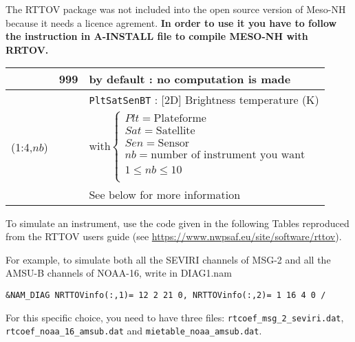 The RTTOV package was not included into the open source version of Meso-NH because it needs a licence agrement.
{\bf In order to use it you have to follow the instruction in A-INSTALL file to compile MESO-NH with RRTOV.}   

\begin{center}
\begin{tabular}{|>{\centering}p{3.1cm}|>{\centering}p{2.4cm}|p{11cm}|}
\hline
\multirow{5}{*}{NRTTOVinfo}\index{NRTTOVinfo!\innam{NAM\_DIAG}}&\textbf{999} & by default : no computation is made\\\cline{2-3}
& \multirow{4}{*}{$Plt$ $Sat$ $Sen$ 0 } &{\tt PltSatSenBT} : [2D] Brightness temperature (K)\\
(1:4,$nb$)& & 
$
\textrm{with}
\left\{
\begin{array}{l}
Plt = \textrm{Plateforme}\\
Sat = \textrm{Satellite}\\
Sen = \textrm{Sensor}\\ 
nb =  \textrm{number of instrument you want}\\
 1\leq nb\leq10\\
\end{array}
\right.
$
\\ 
& & See below for more information\\\hline 
\end{tabular}
\end{center}


\vspace{0.5cm}
To simulate an instrument, use the code given in the following Tables reproduced from the RTTOV users guide (see \url{https://www.nwpsaf.eu/site/software/rttov}). 

For example, to simulate both all the SEVIRI channels of MSG-2 and all the AMSU-B channels of NOAA-16, write in DIAG1.nam
\begin{verbatim}
&NAM_DIAG NRTTOVinfo(:,1)= 12 2 21 0, NRTTOVinfo(:,2)= 1 16 4 0 /
\end{verbatim}
For this specific choice, you need to have three files:
{\tt rtcoef\_msg\_2\_seviri.dat}, {\tt rtcoef\_noaa\_16\_amsub.dat} and {\tt mietable\_noaa\_amsub.dat}.

